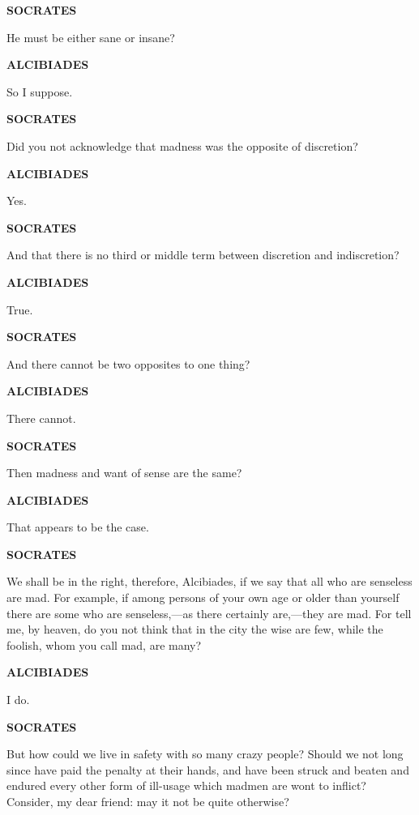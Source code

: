 \documentclass[11pt,letter]{article}
\begin{document}
\par \textbf{SOCRATES}
\par   He must be either sane or insane?

\par \textbf{ALCIBIADES}
\par   So I suppose.

\par \textbf{SOCRATES}
\par   Did you not acknowledge that madness was the opposite of discretion?

\par \textbf{ALCIBIADES}
\par   Yes.

\par \textbf{SOCRATES}
\par   And that there is no third or middle term between discretion and indiscretion?

\par \textbf{ALCIBIADES}
\par   True.

\par \textbf{SOCRATES}
\par   And there cannot be two opposites to one thing?

\par \textbf{ALCIBIADES}
\par   There cannot.

\par \textbf{SOCRATES}
\par   Then madness and want of sense are the same?

\par \textbf{ALCIBIADES}
\par   That appears to be the case.

\par \textbf{SOCRATES}
\par   We shall be in the right, therefore, Alcibiades, if we say that all who are senseless are mad. For example, if among persons of your own age or older than yourself there are some who are senseless,—as there certainly are,—they are mad. For tell me, by heaven, do you not think that in the city the wise are few, while the foolish, whom you call mad, are many?

\par \textbf{ALCIBIADES}
\par   I do.

\par \textbf{SOCRATES}
\par   But how could we live in safety with so many crazy people? Should we not long since have paid the penalty at their hands, and have been struck and beaten and endured every other form of ill-usage which madmen are wont to inflict? Consider, my dear friend:  may it not be quite otherwise?
\end{document}
